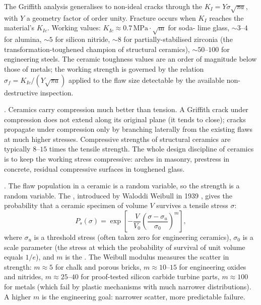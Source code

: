 The Griffith analysis generalises to non-ideal cracks through the
 $K_I = Y \sigma \sqrt{\pi a}$, with
$Y$ a geometry factor of order unity. Fracture occurs when $K_I$
reaches the material's  $K_{Ic}$. Working
values: $K_{Ic} \approx 0.7\,\text{MPa}\cdot\sqrt{\text{m}}$ for soda-
lime glass, $\sim 3\text{--}4$ for alumina, $\sim 5$ for silicon
nitride, $\sim 8$ for partially-stabilised zirconia (the
transformation-toughened champion of structural ceramics),
$\sim 50\text{--}100$ for engineering steels. The ceramic toughness
values are an order of magnitude below those of metals; the working
strength is governed by the relation $\sigma_f = K_{Ic}/(Y\sqrt{\pi
a})$ applied to the flaw size detectable by the available
non-destructive inspection.

. Ceramics carry compression much
better than tension. A Griffith crack under compression does not
extend along its original plane (it tends to close); cracks propagate
under compression only by branching laterally from the existing flaws
at much higher stresses. Compressive strengths of structural ceramics
are typically $8$--$15$ times the tensile strength. The whole design
discipline of ceramics is to keep the working stress compressive: arches
in masonry, prestress in concrete, residual compressive surfaces in
toughened glass.

. The flaw population in a ceramic is a
random variable, so the strength is a random variable. The
, introduced by Waloddi Weibull in 1939
\cite{paper:weibull1939}, gives the probability that a ceramic
specimen of volume $V$ survives a tensile stress $\sigma$:
\[
P_s(\sigma) = \exp\!\left[ - \frac{V}{V_0}
\left(\frac{\sigma - \sigma_u}{\sigma_0}\right)^m \right],
\]
where $\sigma_u$ is a threshold stress (often taken zero for
engineering ceramics), $\sigma_0$ is a scale parameter (the stress at
which the probability of survival of unit volume equals $1/e$), and
$m$ is the . The Weibull modulus measures
the scatter in strength: $m \approx 5$ for chalk and porous bricks,
$m \approx 10$--$15$ for engineering oxides and nitrides,
$m \approx 25$--$40$ for proof-tested silicon carbide turbine parts,
$m \approx 100$ for metals (which fail by plastic mechanisms with
much narrower distributions). A higher $m$ is the engineering goal:
narrower scatter, more predictable failure.

